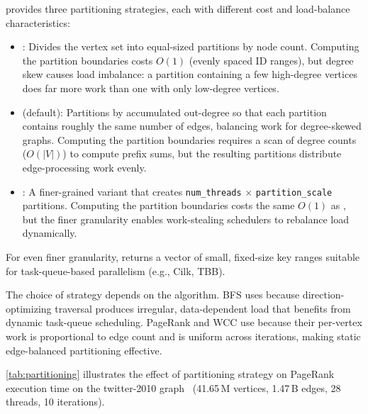 \project{} provides three partitioning strategies, each with different cost and load-balance characteristics:
\begin{itemize}
  \item {}: Divides the vertex set into equal-sized partitions by node count. Computing the partition boundaries costs $O(1)$ (evenly spaced ID ranges), but degree skew causes load imbalance: a partition containing a few high-degree vertices does far more work than one with only low-degree vertices.

  \item {} (default): Partitions by accumulated out-degree so that each partition contains roughly the same number of edges, balancing work for degree-skewed graphs. Computing the partition boundaries requires a scan of degree counts ($O(|V|)$) to compute prefix sums, but the resulting partitions distribute edge-processing work evenly.

  \item {}: A finer-grained variant that creates \texttt{num\_threads} $\times$ \texttt{partition\_scale} partitions.  Computing the partition boundaries costs the same $O(1)$ as , but the finer granularity enables work-stealing schedulers to rebalance load dynamically.
\end{itemize}

For even finer granularity,  returns a vector of small, fixed-size key ranges suitable for task-queue-based parallelism (e.g., Cilk, TBB).

The choice of strategy depends on the algorithm.
BFS uses  because direction-optimizing traversal produces irregular, data-dependent load that benefits from dynamic task-queue scheduling.
PageRank and WCC use  because their per-vertex work is proportional to edge count and is uniform across iterations, making static edge-balanced partitioning effective.

\autoref{tab:partitioning} illustrates the effect of partitioning strategy on PageRank execution time on the twitter-2010 graph~\cite{twitter2010} (41.65\,M vertices, 1.47\,B edges, 28 threads, 10 iterations).

